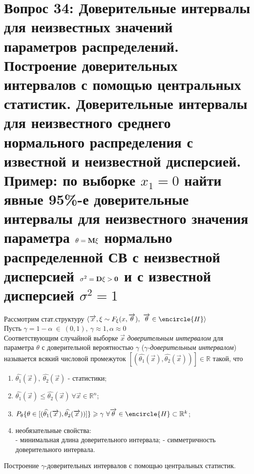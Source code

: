 \section{Вопрос 34:
Доверительные интервалы для неизвестных значений параметров распределений.
Построение доверительных интервалов с помощью центральных статистик.
Доверительные интервалы для неизвестного среднего нормального распределения с известной и неизвестной дисперсией.
Пример: по выборке $x_1=0$ найти явные 95\%-е доверительные интервалы для неизвестного значения параметра
$\theta=\bf{M}\xi$ нормально распределенной СВ с неизвестной дисперсией $\sigma^2=\bf{D}\xi > 0$ и с известной дисперсией $\sigma^2=1$
}

\begin{defs}
  Рассмотрим стат.структуру $\langle\overrightarrow{x},\xi\sim F_{\xi}(x,\overrightarrow{\theta}), \ \overrightarrow{\theta} \in \encircle{H}\rangle$\\
  Пусть $\gamma = 1 - \alpha \ \in \ (0,1), \ \gamma \approx 1, \alpha \approx 0$\\
  Соответствующим случайной выборке $\overrightarrow{x}$ \textit{доверительным интервалом} для параметра $\theta$ с доверительной
  вероятностью $\gamma$ (\textit{$\gamma$-доверительным интервалом}) называется всякий числовой промежуток
  $[(\widehat{\theta_1}(\overrightarrow{x}),\widehat{\theta_2}(\overrightarrow{x}))] \in \mathbb{R}$ такой, что
  \begin{enumerate}
    \item $\widehat{\theta_1}(\overrightarrow{x}), \ \widehat{\theta_2}(\overrightarrow{x})$ - статистики;
    \item $\widehat{\theta_1}(\overrightarrow{x}) \leqslant \widehat{\theta_2}(\overrightarrow{x}) \ \forall \overrightarrow{x} \in \mathbb{R}^n$;
    \item $P_{\theta}\{\theta \in [(\widehat{\theta_1}(\overrightarrow{x}),\widehat{\theta_2}(\overrightarrow{x}))]\} \geqslant \gamma \
    \forall \overrightarrow{\theta} \in \encircle{H} \subset \mathbb{R}^k$;
    \item необязательные свойства:\\
      - минимальная длина доверительного интервала;
      - симметричность доверительного интервала.
  \end{enumerate}
\end{defs}

Построение $\gamma$-доверительных интервалов с помощью центральных статистик.\\

